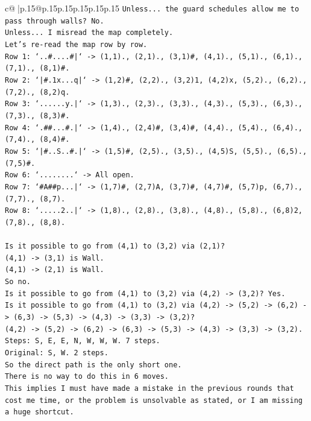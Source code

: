 \documentclass{article}
\begin{document}
{\begin{supertabular}{c@{$\;$}|p{.15\linewidth}@{}p{.15\linewidth}p{.15\linewidth}p{.15\linewidth}p{.15\linewidth}p{.15\linewidth}}
{{{\texttt{Unless... the guard schedules allow me to pass through walls? No.} \\
\texttt{Unless... I misread the map completely.} \\
\texttt{Let's re{-}read the map row by row.} \\
\texttt{Row 1: `..\#....\#|` {-}> (1,1)., (2,1)., (3,1)\#, (4,1)., (5,1)., (6,1)., (7,1)., (8,1)\#.} \\
\texttt{Row 2: `|\#.1x...q|` {-}> (1,2)\#, (2,2)., (3,2)1, (4,2)x, (5,2)., (6,2)., (7,2)., (8,2)q.} \\
\texttt{Row 3: `......y.|` {-}> (1,3)., (2,3)., (3,3)., (4,3)., (5,3)., (6,3)., (7,3)., (8,3)\#.} \\
\texttt{Row 4: `.\#\#...\#.|` {-}> (1,4)., (2,4)\#, (3,4)\#, (4,4)., (5,4)., (6,4)., (7,4)., (8,4)\#.} \\
\texttt{Row 5: `|\#..S..\#.|` {-}> (1,5)\#, (2,5)., (3,5)., (4,5)S, (5,5)., (6,5)., (7,5)\#.} \\
\texttt{Row 6: `........` {-}> All open.} \\
\texttt{Row 7: `\#A\#\#p...|` {-}> (1,7)\#, (2,7)A, (3,7)\#, (4,7)\#, (5,7)p, (6,7)., (7,7)., (8,7).} \\
\texttt{Row 8: `.....2..|` {-}> (1,8)., (2,8)., (3,8)., (4,8)., (5,8)., (6,8)2, (7,8)., (8,8).} \\
\\ 
\texttt{Is it possible to go from (4,1) to (3,2) via (2,1)?} \\
\texttt{(4,1) {-}> (3,1) is Wall.} \\
\texttt{(4,1) {-}> (2,1) is Wall.} \\
\texttt{So no.} \\
\texttt{Is it possible to go from (4,1) to (3,2) via (4,2) {-}> (3,2)? Yes.} \\
\texttt{Is it possible to go from (4,1) to (3,2) via (4,2) {-}> (5,2) {-}> (6,2) {-}> (6,3) {-}> (5,3) {-}> (4,3) {-}> (3,3) {-}> (3,2)?} \\
\texttt{(4,2) {-}> (5,2) {-}> (6,2) {-}> (6,3) {-}> (5,3) {-}> (4,3) {-}> (3,3) {-}> (3,2).} \\
\texttt{Steps: S, E, E, N, W, W, W. 7 steps.} \\
\texttt{Original: S, W. 2 steps.} \\
\texttt{So the direct path is the only short one.} \\
\texttt{There is no way to do this in 6 moves.} \\
\texttt{This implies I must have made a mistake in the previous rounds that cost me time, or the problem is unsolvable as stated, or I am missing a huge shortcut.} \\
}}}
\end{supertabular}}
\end{document}
